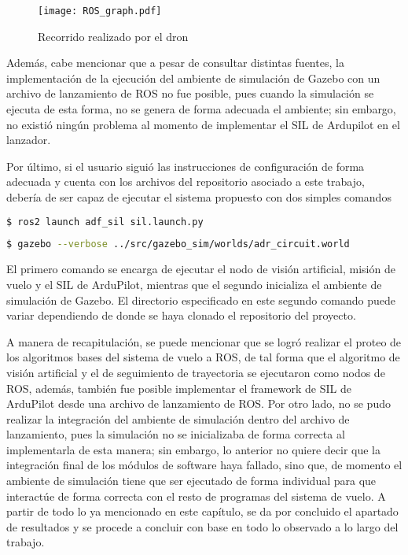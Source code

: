 \begin{figure}[ht]
    \centering
    \texttt{[image: ROS\_graph.pdf]}
    \caption{Recorrido realizado por el dron}
    \label{fig:ROS_graph}
\end{figure}


Además, cabe mencionar que a pesar de consultar distintas fuentes, la implementación de la ejecución del ambiente de simulación de Gazebo con un archivo de lanzamiento de ROS no fue posible, pues cuando la simulación se ejecuta de esta forma, no se genera de forma adecuada el ambiente; sin embargo, no existió ningún problema al momento de implementar el SIL de Ardupilot en el lanzador.

Por último, si el usuario siguió las instrucciones de configuración de forma adecuada y cuenta con los archivos del repositorio asociado a este trabajo, debería de ser capaz de ejecutar el sistema propuesto con dos simples comandos

\begin{lstlisting}[language = bash]
    $ ros2 launch adf_sil sil.launch.py
\end{lstlisting}

\begin{lstlisting}[language = bash]
    $ gazebo --verbose ../src/gazebo_sim/worlds/adr_circuit.world
\end{lstlisting}


El primero comando se encarga de ejecutar el nodo de visión artificial, misión de vuelo y el SIL de ArduPilot, mientras que el segundo inicializa el ambiente de simulación de Gazebo. El directorio especificado en este segundo comando puede variar dependiendo de donde se haya clonado el repositorio del proyecto.

A manera de recapitulación, se puede mencionar que se logró realizar el proteo de los algoritmos bases del sistema de vuelo a ROS, de tal forma que el algoritmo de visión artificial y el de seguimiento de trayectoria se ejecutaron como nodos de ROS, además, también fue posible implementar el framework de SIL de ArduPilot desde una archivo de lanzamiento de ROS. Por otro lado, no se pudo realizar la integración del ambiente de simulación dentro del archivo de lanzamiento, pues la simulación no se inicializaba de forma correcta al implementarla de esta manera; sin embargo, lo anterior no quiere decir que la integración final de los módulos de software haya fallado, sino que, de momento el ambiente de simulación tiene que ser ejecutado de forma individual para que interactúe de forma correcta con el resto de programas del sistema de vuelo.
A partir de todo lo ya mencionado en este capítulo, se da por concluido el apartado de resultados y se procede a concluir con base en todo lo observado a lo largo del trabajo.